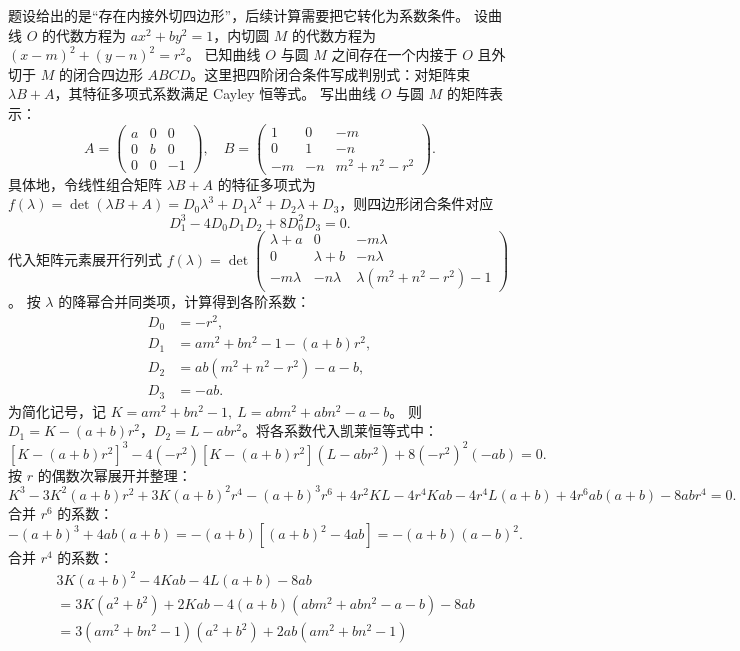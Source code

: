\begin{solution}
题设给出的是“存在内接外切四边形”，后续计算需要把它转化为系数条件。
设曲线 $O$ 的代数方程为 $ax^2 + by^2 = 1$，内切圆 $M$ 的代数方程为 $(x - m)^2 + (y - n)^2 = r^2$。
已知曲线 $O$ 与圆 $M$ 之间存在一个内接于 $O$ 且外切于 $M$ 的闭合四边形 $ABCD$。这里把四阶闭合条件写成判别式：对矩阵束 $\lambda B+A$，其特征多项式系数满足 Cayley 恒等式。
写出曲线 $O$ 与圆 $M$ 的矩阵表示：
\[ A = \begin{pmatrix} a & 0 & 0 \\ 0 & b & 0 \\ 0 & 0 & -1 \end{pmatrix}, \quad B = \begin{pmatrix} 1 & 0 & -m \\ 0 & 1 & -n \\ -m & -n & m^2+n^2-r^2 \end{pmatrix}. \]
具体地，令线性组合矩阵 $\lambda B + A$ 的特征多项式为 $f(\lambda) = \det(\lambda B + A) = D_0 \lambda^3 + D_1 \lambda^2 + D_2 \lambda + D_3$，则四边形闭合条件对应
\[ D_1^3 - 4 D_0 D_1 D_2 + 8 D_0^2 D_3 = 0. \]
代入矩阵元素展开行列式 $f(\lambda) = \det \begin{pmatrix} \lambda+a & 0 & -m\lambda \\ 0 & \lambda+b & -n\lambda \\ -m\lambda & -n\lambda & \lambda(m^2+n^2-r^2) - 1 \end{pmatrix}$。
按 $\lambda$ 的降幂合并同类项，计算得到各阶系数：
\begin{align*}
D_0 &= -r^2, \\
D_1 &= am^2 + bn^2 - 1 - (a+b)r^2, \\
D_2 &= ab(m^2 + n^2 - r^2) - a - b, \\
D_3 &= -ab.
\end{align*}
为简化记号，记 $K = am^2 + bn^2 - 1,\ L = abm^2 + abn^2 - a - b$。
则 $D_1 = K - (a+b)r^2$，$D_2 = L - abr^2$。将各系数代入凯莱恒等式中：
\[ [K - (a+b)r^2]^3 - 4(-r^2)[K - (a+b)r^2](L - abr^2) + 8(-r^2)^2(-ab) = 0. \]
按 $r$ 的偶数次幂展开并整理：
\[ K^3 - 3K^2(a+b)r^2 + 3K(a+b)^2 r^4 - (a+b)^3 r^6 + 4r^2 K L - 4r^4 K ab - 4r^4 L(a+b) + 4r^6 ab(a+b) - 8ab r^4 = 0. \]
合并 $r^6$ 的系数：
\[ -(a+b)^3 + 4ab(a+b) = -(a+b)[(a+b)^2 - 4ab] = -(a+b)(a-b)^2. \]
合并 $r^4$ 的系数：
\begin{align*}
&3K(a+b)^2 - 4Kab - 4L(a+b) - 8ab \\
&= 3K(a^2+b^2) + 2Kab - 4(a+b)(abm^2+abn^2-a-b) - 8ab \\
&= 3(am^2+bn^2-1)(a^2+b^2) + 2ab(am^2+bn^2-1) \\

\end{align*}
\end{solution}
